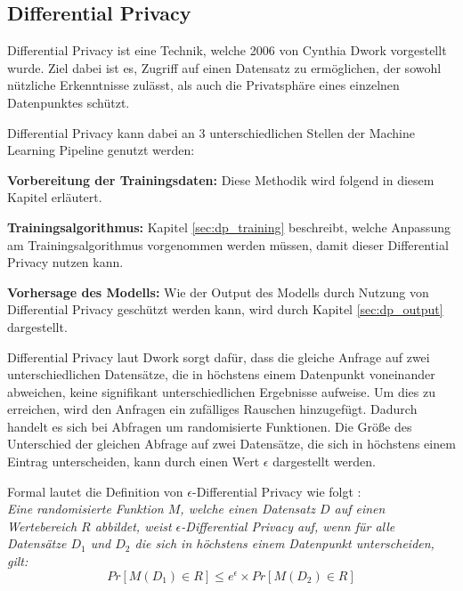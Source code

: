 \subsection{Differential Privacy}\label{sec:dp}

Differential Privacy ist eine Technik, welche 2006 von Cynthia Dwork \cite{P-26} vorgestellt wurde.
Ziel dabei ist es, Zugriff auf einen Datensatz zu ermöglichen, der sowohl nützliche Erkenntnisse zulässt, als auch die Privatsphäre eines einzelnen Datenpunktes schützt.

Differential Privacy kann dabei an 3 unterschiedlichen Stellen der Machine Learning Pipeline genutzt werden:
\begin{compactitem}
\item \textbf{Vorbereitung der Trainingsdaten:} Diese Methodik wird folgend in diesem Kapitel erläutert.
\item \textbf{Trainingsalgorithmus:} Kapitel \ref{sec:dp_training} beschreibt, welche Anpassung am Trainingsalgorithmus vorgenommen werden müssen, damit dieser Differential Privacy nutzen kann.
\item \textbf{Vorhersage des Modells:} Wie der Output des Modells durch Nutzung von Differential Privacy geschützt werden kann, wird durch Kapitel \ref{sec:dp_output} dargestellt.
\end{compactitem}


Differential Privacy laut Dwork \cite{P-26} sorgt dafür, dass die gleiche Anfrage auf zwei unterschiedlichen Datensätze, die in höchstens einem Datenpunkt voneinander abweichen, keine signifikant unterschiedlichen Ergebnisse aufweise. 
Um dies zu erreichen, wird den Anfragen ein zufälliges Rauschen hinzugefügt. 
Dadurch handelt es sich bei Abfragen um randomisierte Funktionen.
Die Größe des Unterschied der gleichen Abfrage auf zwei Datensätze, die sich in höchstens einem Eintrag unterscheiden, kann durch einen Wert $\epsilon$ dargestellt werden.

Formal lautet die Definition von $\epsilon$-Differential Privacy wie folgt \cite{P-26}:\\
\textit{
Eine randomisierte Funktion $M$, welche einen Datensatz $D$ auf einen Wertebereich $R$ abbildet, weist $\epsilon$-Differential Privacy auf, wenn für alle Datensätze $D_{1}$ und $D_{2}$ die sich in höchstens einem Datenpunkt unterscheiden, gilt:}
\begin{equation}
    Pr[M(D_{1}) \in R] \leq e^{\epsilon} \times Pr[M(D_{2}) \in R]
\end{equation}

